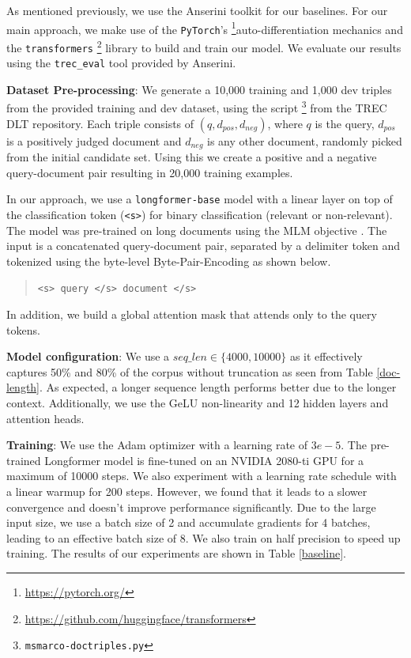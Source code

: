 \documentclass[sigconf, nonacm=true]{acmart}
\begin{document}
As mentioned previously, we use the Anserini toolkit for our baselines. For our main approach, we make use of the \texttt{PyTorch}'s \footnote{\href{https://pytorch.org/}{https://pytorch.org/}}auto-differentiation mechanics and the \texttt{transformers} \footnote{\href{https://github.com/huggingface/transformers}{https://github.com/huggingface/transformers}} library to build and train our model. We evaluate our results using the \texttt{trec\_eval} tool provided by Anserini. 

\medskip

\noindent \textbf{Dataset Pre-processing}: We generate a 10,000 training and 1,000 dev triples from the provided training and dev dataset, using the script \footnote{\texttt{msmarco-doctriples.py}} from the TREC DLT repository. Each triple consists of $(q, d_{pos}, d_{neg})$, where $q$ is the query, $d_{pos}$ is a positively judged document and $d_{neg}$ is any other document, randomly picked from the initial candidate set. Using this we create a positive and a negative query-document pair resulting in 20,000 training examples.

In our approach, we use a \texttt{longformer-base} model with a linear layer on top of the classification token (\texttt{<s>}) for binary classification (relevant or non-relevant). The model was pre-trained on long documents using the MLM objective \cite{Devlin2019BERTPO}. The input is a concatenated query-document pair, separated by a delimiter token and tokenized using the byte-level Byte-Pair-Encoding \cite{Liu2019RoBERTaAR} as shown below.

\begin{quote}
  \texttt{<s> query </s> document </s>}
\end{quote}

In addition, we build a global attention mask that attends only to the query tokens.

\smallskip

\noindent \textbf{Model configuration}: We use a $seq\_len \in \{4000, 10000\}$ as it effectively captures 50\% and 80\% of the corpus without truncation as seen from Table \ref{doc-length}. As expected, a longer sequence length performs better due to the longer context. Additionally, we use the GeLU non-linearity and 12 hidden layers and attention heads.

\smallskip

\noindent \textbf{Training}: We use the Adam optimizer \cite{Kingma2015AdamAM} with a learning rate of $3e-5$. The pre-trained Longformer model is fine-tuned on an NVIDIA 2080-ti GPU for a maximum of 10000 steps. We also experiment with a learning rate schedule with a linear warmup for 200 steps. However, we found that it leads to a slower convergence and doesn't improve performance significantly. Due to the large input size, we use a batch size of 2 and accumulate gradients for 4 batches, leading to an effective batch size of 8. We also train on half precision to speed up training. The results of our experiments are shown in Table \ref{baseline}.
\end{document}
